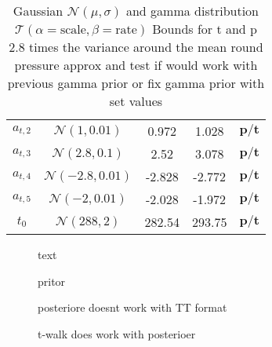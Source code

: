 \begin{table}
\begin{tabular}{ |c||c|c|c|c|   }
	$a_{t,2}$ &  $\mathcal{N}(1,0.01)$&0.972 &1.028&$\bm{p/t}$\\
	$a_{t,3}$ &  $\mathcal{N}(2.8,0.1)$&2.52 &3.078&$\bm{p/t}$\\
	$a_{t,4}$ &  $\mathcal{N}(-2.8,0.01)$&-2.828 &-2.772&$\bm{p/t}$\\
	$a_{t,5}$ & $\mathcal{N}(-2,0.01)$ &-2.028 &-1.972&$\bm{p/t}$\\
	$t_{0}$ &  $\mathcal{N}(288,2)$& 282.54 &293.75&$\bm{p/t}$\\
	\hline
\end{tabular}
\caption{Gaussian $\mathcal{N}(\mu,\sigma)$ and gamma distribution $\mathcal{T}(\alpha = \text{scale}, \beta = \text{rate})$
	Bounds for t and p 2.8 times the variance around the mean
round pressure approx and  test if would work with previous gamma prior or fix gamma prior with set values}
\label{tab:1}
\end{table}

\begin{figure}[t!]
	\centering
	\begin{subfigure}[]{.49\columnwidth}
		\centering
		\scalebox{0.42}{}
		\caption{}
	\end{subfigure}%
	\begin{subfigure}[]{.49\columnwidth}
		\centering
		\scalebox{0.42}{}
		\caption{}
	\end{subfigure}
	\caption{}
\end{figure}

\begin{figure}[h]
	\centering
	\scalebox{0.66}{}
	\caption[]{text}
	\label{fig:Results}
\end{figure}



\begin{figure}[h]
	\centering
	\scalebox{0.66}{}
	\caption[]{pritor}
	\label{fig:Results}
\end{figure}

\begin{figure}[h]
	\centering
	\scalebox{0.66}{}
	\caption[]{posteriore doesnt work with TT format}
	\label{fig:Results}
\end{figure}


\begin{figure}[h]
	\centering
	\scalebox{0.66}{}
	\caption[]{t-walk does work with posterioer}
	\label{fig:Results}
\end{figure}

